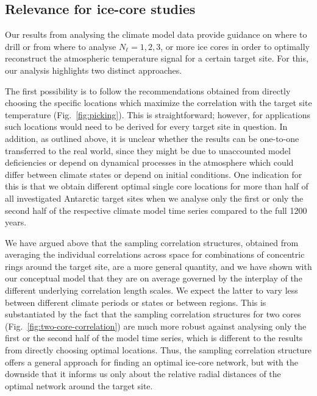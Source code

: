 \documentclass[cp]{copernicus}
\begin{document}
\subsection{Relevance for ice-core studies}
\label{discussion:relevance}

Our results from analysing the climate model data provide guidance on where to
drill or from where to analyse $N_{\ell}=1, 2, 3$, or more ice cores in order to
optimally reconstruct the atmospheric temperature signal for a certain target
site. For this, our analysis highlights two distinct approaches.

The first possibility is to follow the recommendations obtained from directly
choosing the specific locations which maximize the correlation with the target
site temperature (Fig.~\ref{fig:picking}). This is straightforward; however, for
applications such locations would need to be derived for every target site in
question. In addition, as outlined above, it is unclear whether the results can
be one-to-one transferred to the real world, since they might be due to
unaccounted model deficiencies or depend on dynamical processes in the
atmosphere which could differ between climate states or depend on initial
conditions. One indication for this is that we obtain different optimal single
core locations for more than half of all investigated Antarctic target sites
when we analyse only the first or only the second half of the respective climate
model time series compared to the full 1200 years.

We have argued above that the sampling correlation structures, obtained from
averaging the individual correlations across space for combinations of
concentric rings around the target site, are a more general quantity, and we
have shown with our conceptual model that they are on average governed by the
interplay of the different underlying correlation length scales. We expect the
latter to vary less between different climate periods or states or between
regions. This is substantiated by the fact that the sampling correlation
structures for two cores (Fig.~\ref{fig:two-core-correlation}) are much more
robust against analysing only the first or the second half of the model time
series, which is different to the results from directly choosing optimal
locations. Thus, the sampling correlation structure offers a general approach
for finding an optimal ice-core network, but with the downside that it informs
us only about the relative radial distances of the optimal network around the
target site.
\end{document}
